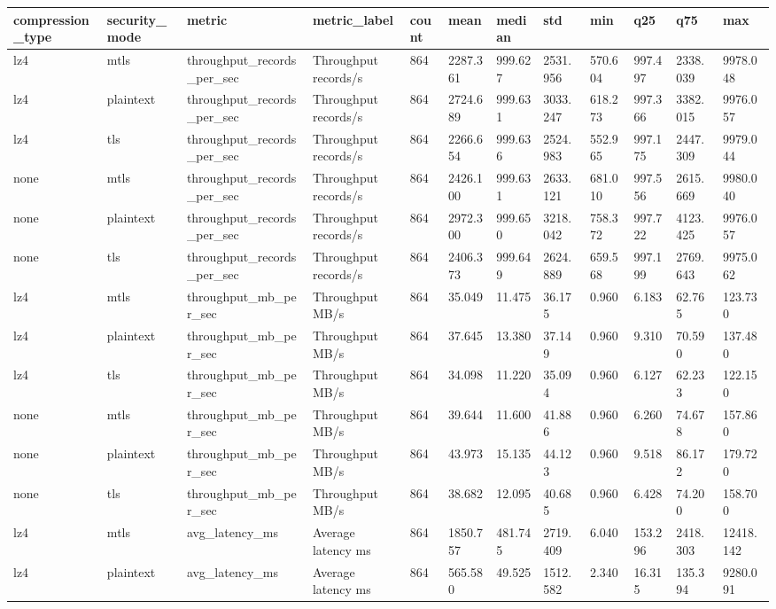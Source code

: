 \begin{longtable}{llllllllllll}
\hline
compression\_type & security\_mode & metric & metric\_label & count & mean & median & std & min & q25 & q75 & max \\
\hline
lz4 & mtls & throughput\_records\_per\_sec & Throughput records/s & 864 & 2287.361 & 999.627 & 2531.956 & 570.604 & 997.497 & 2338.039 & 9978.048 \\
lz4 & plaintext & throughput\_records\_per\_sec & Throughput records/s & 864 & 2724.689 & 999.631 & 3033.247 & 618.273 & 997.366 & 3382.015 & 9976.057 \\
lz4 & tls & throughput\_records\_per\_sec & Throughput records/s & 864 & 2266.654 & 999.636 & 2524.983 & 552.965 & 997.175 & 2447.309 & 9979.044 \\
none & mtls & throughput\_records\_per\_sec & Throughput records/s & 864 & 2426.100 & 999.631 & 2633.121 & 681.010 & 997.556 & 2615.669 & 9980.040 \\
none & plaintext & throughput\_records\_per\_sec & Throughput records/s & 864 & 2972.300 & 999.650 & 3218.042 & 758.372 & 997.722 & 4123.425 & 9976.057 \\
none & tls & throughput\_records\_per\_sec & Throughput records/s & 864 & 2406.373 & 999.649 & 2624.889 & 659.568 & 997.199 & 2769.643 & 9975.062 \\
lz4 & mtls & throughput\_mb\_per\_sec & Throughput MB/s & 864 & 35.049 & 11.475 & 36.175 & 0.960 & 6.183 & 62.765 & 123.730 \\
lz4 & plaintext & throughput\_mb\_per\_sec & Throughput MB/s & 864 & 37.645 & 13.380 & 37.149 & 0.960 & 9.310 & 70.590 & 137.480 \\
lz4 & tls & throughput\_mb\_per\_sec & Throughput MB/s & 864 & 34.098 & 11.220 & 35.094 & 0.960 & 6.127 & 62.233 & 122.150 \\
none & mtls & throughput\_mb\_per\_sec & Throughput MB/s & 864 & 39.644 & 11.600 & 41.886 & 0.960 & 6.260 & 74.678 & 157.860 \\
none & plaintext & throughput\_mb\_per\_sec & Throughput MB/s & 864 & 43.973 & 15.135 & 44.123 & 0.960 & 9.518 & 86.172 & 179.720 \\
none & tls & throughput\_mb\_per\_sec & Throughput MB/s & 864 & 38.682 & 12.095 & 40.685 & 0.960 & 6.428 & 74.200 & 158.700 \\
lz4 & mtls & avg\_latency\_ms & Average latency ms & 864 & 1850.757 & 481.745 & 2719.409 & 6.040 & 153.296 & 2418.303 & 12418.142 \\
lz4 & plaintext & avg\_latency\_ms & Average latency ms & 864 & 565.580 & 49.525 & 1512.582 & 2.340 & 16.315 & 135.394 & 9280.091 \\

\end{longtable}

